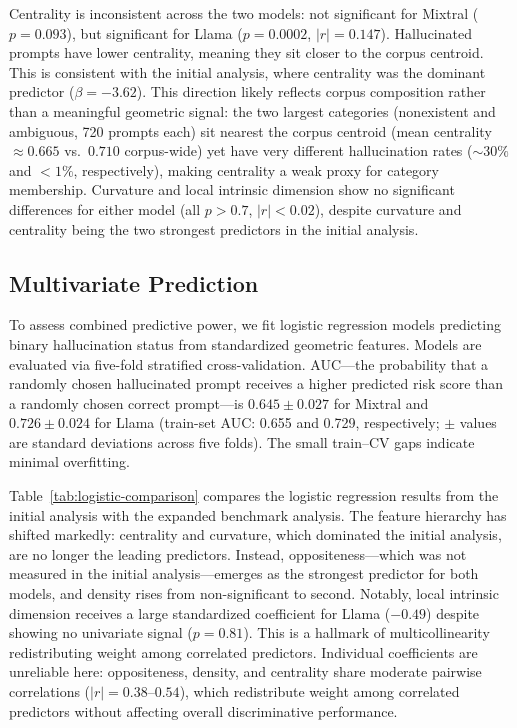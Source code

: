 Centrality is inconsistent across the two models: not significant for Mixtral ($p = 0.093$), but significant for Llama ($p = 0.0002$, $|r| = 0.147$). Hallucinated prompts have lower centrality, meaning they sit closer to the corpus centroid. This is consistent with the initial analysis, where centrality was the dominant predictor ($\beta = -3.62$). This direction likely reflects corpus composition rather than a meaningful geometric signal: the two largest categories (nonexistent and ambiguous, 720 prompts each) sit nearest the corpus centroid (mean centrality $\approx 0.665$ vs.\ $0.710$ corpus-wide) yet have very different hallucination rates (${\sim}30\%$ and ${<}1\%$, respectively), making centrality a weak proxy for category membership. Curvature and local intrinsic dimension show no significant differences for either model (all $p > 0.7$, $|r| < 0.02$), despite curvature and centrality being the two strongest predictors in the initial analysis.

\subsection{Multivariate Prediction}
\label{sec:multivariate-prediction}

To assess combined predictive power, we fit logistic regression models predicting binary hallucination status from standardized geometric features. Models are evaluated via five-fold stratified cross-validation. AUC---the probability that a randomly chosen hallucinated prompt receives a higher predicted risk score than a randomly chosen correct prompt---is $0.645 \pm 0.027$ for Mixtral and $0.726 \pm 0.024$ for Llama (train-set AUC: 0.655 and 0.729, respectively; $\pm$ values are standard deviations across five folds). The small train--CV gaps indicate minimal overfitting.

Table~\ref{tab:logistic-comparison} compares the logistic regression results from the initial analysis with the expanded benchmark analysis. The feature hierarchy has shifted markedly: centrality and curvature, which dominated the initial analysis, are no longer the leading predictors. Instead, oppositeness---which was not measured in the initial analysis---emerges as the strongest predictor for both models, and density rises from non-significant to second. Notably, local intrinsic dimension receives a large standardized coefficient for Llama ($-0.49$) despite showing no univariate signal ($p = 0.81$). This is a hallmark of multicollinearity redistributing weight among correlated predictors. Individual coefficients are unreliable here: oppositeness, density, and centrality share moderate pairwise correlations ($|r| = 0.38$--$0.54$), which redistribute weight among correlated predictors without affecting overall discriminative performance.

